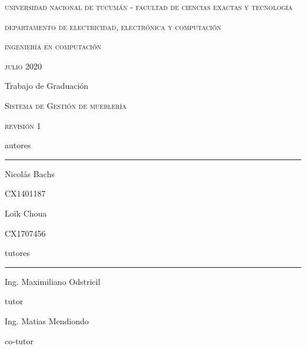 \documentclass[a4paper,oneside]{book}
\begin{document}
\sloppy

\begin{titlepage}
	\centering
	{\scshape universidad nacional de tucumán - facultad de ciencias exactas y tecnología\par}
	{\scshape departamento de electricidad, electrónica y computación\par}
	{\scshape\Large ingeniería en computación\par}
	\vspace{0.5cm}
	{\scshape julio 2020\par} %
	\vfill
	{\LARGE\mdseries Trabajo de Graduación\par}
	\vspace{0.5cm}
	{\scshape\huge Sistema de Gestión de mueblería\par}
	{\scshape revisión 1\par}
	\vfill
	{\mdseries autores\par}
	\par\noindent\rule{0.9\textwidth}{0.2pt}
	\begin{multicols}{2}
	{\large Nicolás Bachs\par}
	{\small CX1401187\par}
	\columnbreak
	{\large Loïk Choua\par}
	{\small CX1707456\par}
	\end{multicols}
	\vspace{0.5cm}
	{\mdseries tutores\par}
	\par\noindent\rule{0.9\textwidth}{0.2pt}
	\begin{multicols}{2}
	{\large Ing. Maximiliano Odstricil\par}
	{\small tutor\par}
	\columnbreak
	{\large Ing. Matias Mendiondo\par}
	{\small co-tutor\par}
	\end{multicols}
\end{titlepage}



\tableofcontents




%
%
%
%
%
%
\end{document}
